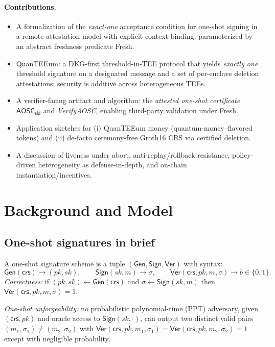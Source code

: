 \documentclass[runningheads,orivec]{llncs}
\newcommand{\prot}{\textsf{QuanTEEum}}
\newcommand{\sid}{\mathsf{sid}}
\begin{document}
\paragraph{Contributions.}
\begin{itemize}[leftmargin=*,itemsep=0.25em,topsep=0.25em]
  \item A formalization of the \emph{exact-one} acceptance condition for one-shot signing in a remote attestation model with explicit context binding, parameterized by an abstract freshness predicate \textsf{Fresh}.
  \item \prot{}: a DKG-first threshold-in-TEE protocol that yields \emph{exactly one} threshold signature on a designated message and a set of per-enclave deletion attestations; security is additive across heterogeneous TEEs.
  \item A verifier-facing artifact and algorithm: the \emph{attested one-shot certificate} $\mathsf{AOSC}_\sid$ and \emph{VerifyAOSC}, enabling third-party validation under \textsf{Fresh}.
  \item Application sketches for (i) QuanTEEum money (quantum-money–flavored tokens) and (ii) de-facto ceremony-free Groth16 CRS via certified deletion.
  \item A discussion of liveness under abort, anti-replay/rollback resistance, policy-driven heterogeneity as defense-in-depth, and on-chain instantiation/incentives.
\end{itemize}

\section{Background and Model}
\subsection{One-shot signatures in brief}
A one-shot signature scheme \cite{amos2020one} is a tuple $(\mathsf{Gen},\mathsf{Sign},\mathsf{Ver})$ with syntax:
\[
\mathsf{Gen}(\mathsf{crs}) \rightarrow (pk,sk),\qquad
\mathsf{Sign}(sk,m) \rightarrow \sigma,\qquad
\mathsf{Ver}(\mathsf{crs},pk,m,\sigma) \rightarrow b \in \{0,1\}.
\]
\emph{Correctness:} if $(pk,sk) \leftarrow \mathsf{Gen}(\mathsf{crs})$ and $\sigma \leftarrow \mathsf{Sign}(sk,m)$ then $\mathsf{Ver}(\mathsf{crs},pk,m,\sigma)=1$. 

\smallskip
\noindent\emph{One-shot unforgeability:} no probabilistic polynomial-time (PPT) adversary, given $(\mathsf{crs},pk)$ and oracle access to $\mathsf{Sign}(sk,\cdot)$, can output two distinct valid pairs $(m_1,\sigma_1)\neq(m_2,\sigma_2)$ with $\mathsf{Ver}(\mathsf{crs},pk,m_1,\sigma_1)=\mathsf{Ver}(\mathsf{crs},pk,m_2,\sigma_2)=1$ except with negligible probability.
\end{document}

